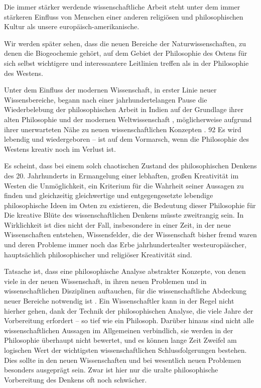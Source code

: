 \documentclass[11pt,a4paper]{book}
\begin{document}
Die immer stärker werdende wissenschaftliche Arbeit steht unter dem immer stärkeren Einfluss von Menschen einer anderen religiösen und philosophischen Kultur als unsere europäisch-amerikanische.



Wir werden später sehen, dass die neuen Bereiche der Naturwissenschaften, zu denen die Biogeochemie gehört, auf dem Gebiet der Philosophie des Ostens für sich selbst wichtigere und interessantere Leitlinien treffen als in der Philosophie des Westens.



Unter dem Einfluss der modernen Wissenschaft, in erster Linie neuer Wissensbereiche, begann nach einer jahrhundertelangen Pause die Wiederbelebung der philosophischen Arbeit in Indien auf der Grundlage ihrer alten Philosophie und der modernen Weltwissenschaft , möglicherweise aufgrund ihrer unerwarteten Nähe zu neuen wissenschaftlichen Konzepten . 92 Es wird lebendig und wiedergeboren -- ist auf dem Vormarsch, wenn die Philosophie des Westens kreativ noch im Verlust ist.



Es scheint, dass bei einem solch chaotischen Zustand des philosophischen Denkens des 20. Jahrhunderts in Ermangelung einer lebhaften, großen Kreativität im Westen die Unmöglichkeit, ein Kriterium für die Wahrheit seiner Aussagen zu finden und gleichzeitig gleichwertige und entgegengesetzte lebendige philosophische Ideen im Osten zu existieren, die Bedeutung dieser Philosophie für Die kreative Blüte des wissenschaftlichen Denkens müsste zweitrangig sein. In Wirklichkeit ist dies nicht der Fall, insbesondere in einer Zeit, in der neue Wissenschaften entstehen, Wissensfelder, die der Wissenschaft bisher fremd waren und deren Probleme immer noch das Erbe jahrhundertealter westeuropäischer, hauptsächlich philosophischer und religiöser Kreativität sind.



Tatsache ist, dass eine philosophische Analyse abstrakter Konzepte, von denen viele in der neuen Wissenschaft, in ihren neuen Problemen und in wissenschaftlichen Disziplinen auftauchen, für die wissenschaftliche Abdeckung neuer Bereiche notwendig ist . Ein Wissenschaftler kann in der Regel nicht hierher gehen, dank der Technik der philosophischen Analyse, die viele Jahre der Vorbereitung erfordert -- so tief wie ein Philosoph. Darüber hinaus sind nicht alle wissenschaftlichen Aussagen im Allgemeinen verbindlich, sie werden in der Philosophie überhaupt nicht bewertet, und es können lange Zeit Zweifel am logischen Wert der wichtigsten wissenschaftlichen Schlussfolgerungen bestehen. Dies sollte in den neuen Wissenschaften und bei wesentlich neuen Problemen besonders ausgeprägt sein. Zwar ist hier nur die uralte philosophische Vorbereitung des Denkens oft noch schwächer.
\end{document}
